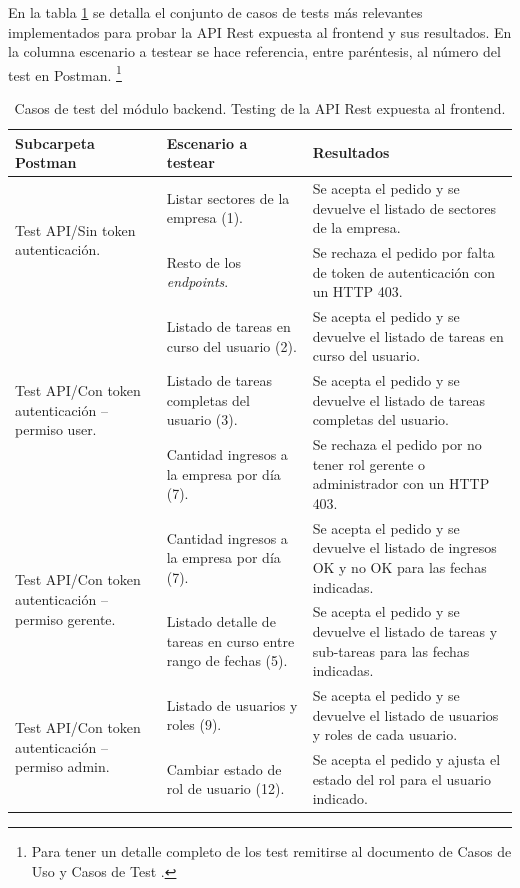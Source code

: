 En la tabla \ref{tab:tablaTestBackendFrontend} se detalla el conjunto de casos de tests más relevantes implementados para probar la API Rest expuesta al frontend y sus resultados. En la columna escenario a testear se hace referencia, entre paréntesis, al número del test en Postman.  \footnote{\label{notaReusadaCasosTest}Para tener un detalle completo de los test remitirse al documento de Casos de Uso y Casos de Test \citep{WEBSITE:CasosUsoYTest}.}


\begin{table}[h]
	\centering
	\caption[Tipos de pruebas backend. Testing de la API Rest]{Casos de test del módulo backend. Testing de la API Rest expuesta al frontend.}
	\begin{tabular}{p{3.5cm} p{3.5cm} p{5cm}} 	

		\toprule
		\textbf{Subcarpeta Postman} & 
		\textbf{Escenario a testear} &
		\textbf{Resultados} 
		\\
		\midrule

\multirow{2}{3.5cm}{Test API/Sin token autenticación.} & Listar sectores de la empresa (1). & Se acepta el pedido y se devuelve el listado de sectores de la empresa. \\
                    & Resto de los \textit{endpoints}. & Se rechaza el pedido por falta de token de autenticación con un HTTP 403. \\
\hline
\multirow{3}{3.5cm}{Test API/Con token autenticación – permiso user.} & Listado de tareas en curso del usuario (2). & Se acepta el pedido y se devuelve el listado de tareas en curso del usuario. \\
                    & Listado de tareas completas del usuario (3). & Se acepta el pedido y se devuelve el listado de tareas completas del usuario. \\
                    & Cantidad ingresos a la empresa por día (7). & Se rechaza el pedido por no tener rol gerente o administrador con un HTTP 403. \\
\hline
\multirow{2}{3.5cm}{Test API/Con token autenticación – permiso gerente.}  & Cantidad ingresos a la empresa por día (7). & Se acepta el pedido y se devuelve el listado de ingresos OK y no OK para las fechas indicadas. \\
                    & Listado detalle de tareas en curso entre rango de fechas (5). & Se acepta el pedido y se devuelve el listado de tareas y sub-tareas para las fechas indicadas. \\
\hline
\multirow{2}{3.5cm}{Test API/Con token autenticación – permiso admin.}  & Listado de usuarios y roles (9). & Se acepta el pedido y se devuelve el listado de usuarios y roles de cada usuario. \\
                    & Cambiar estado de rol de usuario (12). & Se acepta el pedido y ajusta el estado del rol para el usuario indicado. \\
		\bottomrule
		\hline
	\end{tabular}
	\label{tab:tablaTestBackendFrontend}
\end{table}

